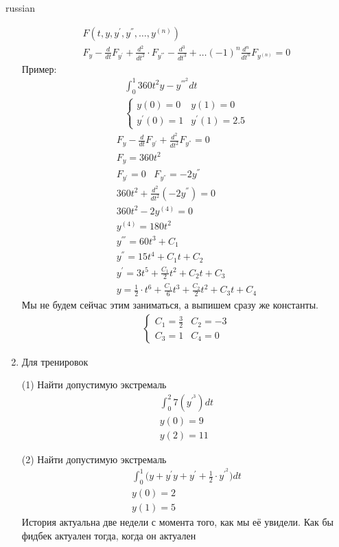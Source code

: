 \documentclass{article}
\begin{document}
\begin{otherlanguage*}{russian}
\begin{enumerate}
\begin{align}
F(t, y, y^{'}, y^{''}, \ldots, y^{(n)} ) \\
F_y - \frac{d}{dt} F_{y^{'}} + \frac{d^2}{dt^2} \cdot F_{y^{'''}} - \frac{d^3}{dt^3} + \ldots (-1) ^ n \frac{d^n}{dt^n} F_{y^{(n)}} = 0 
\end{align}
Пример: 
\begin{align}
\int_0^1 360 t^2 y - y^{'''^2} dt \\
\begin{cases}
y(0) = 0 & y(1) = 0 \\ 
y^{'} (0) = 1 & y^{'} (1) = 2.5 
\end{cases}
\end{align}
\begin{align}
F_y - \frac{d}{dt} F_{y^{'}} + \frac{d^2}{dt^2} F_{y^{''}} = 0 \\
F_y = 360 t ^ 2 \\
F_{y^{'}} = 0 \,\,\,\,\, F_{y^{''}} = - 2 y^{''} \\
360 t ^ 2 + \frac{d^2}{dt^2} (-2 y^{''}) = 0 \\
360 t ^2 - 2 y^{(4)} = 0 \\
y^{(4)} = 180 t ^ 2 \\
y^{'''} = 60 t ^3 + C_1 \\
y^{''} = 15 t ^ 4 + C_1 t + C_2 \\
y^{'} = 3t^5 + \frac{C_1}{2} t^2 + C_2 t + C_3 \\
y = \frac{1}{2} \cdot t ^ 6 + \frac{C_1}{6} t^3 + \frac{C_2}{2} t^2 + C_3 t + C_4 
\end{align}
Мы не будем сейчас этим заниматься, а выпишем сразу же константы. 
\begin{align}
\begin{cases}
C_1 = \frac{3}{2} & C_2 = - 3\\
C_3 = 1 & C_4 = 0 
\end{cases}
\end{align}

\item Для тренировок 

(1) Найти допустимую экстремаль
\begin{align}
\int_0^2 7(y^{'^{3}}) dt \\
y(0) = 9\\
y(2) = 11
\end{align}

(2) Найти допустимую экстремаль 
\begin{align}
\int_0^1 \Big( y + y^{'} y + y^{'} + \frac{1}{2} \cdot y^{'^{2}} \Big) dt \\
y(0) = 2 \\
y(1) = 5  
\end{align}
История актуальна две недели с момента того, как мы её увидели. Как бы фидбек актуален тогда, когда он актуален 
\end{enumerate}
\end{otherlanguage*}
\end{document}
